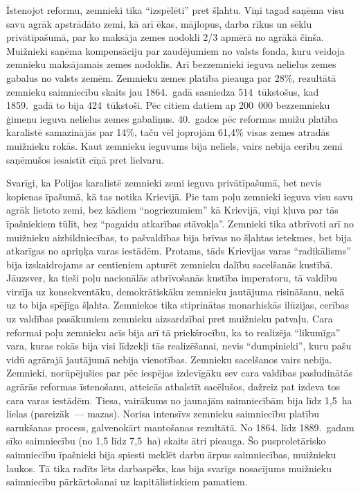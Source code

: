 \documentclass[twoside,a5paper,12pt,fleqn,openany]{extbook}
\begin{document}
Īstenojot reformu, zemnieki tika ``izspēlēti'' pret šļahtu. Viņi tagad saņēma visu savu agrāk apstrādāto zemi, kā arī ēkas, mājlopus, darba rīkus un sēklu privātīpašumā, par ko maksāja zemes nodokli 2/3 apmērā no agrākā činša. Muižnieki saņēma kompensāciju par zaudējumiem no valsts fonda, kuru veidoja zemnieku maksājamais zemes nodoklis. Arī bezzemnieki ieguva nelielus zemes gabalus no valsts zemēm. Zemnieku zemes platība pieauga par 28\%, rezultātā zemnieku saimniecību skaits jau 1864.~gadā sasniedza 514~tūkstošus, kad 1859.~gadā to bija 424~tūkstoši. Pēc citiem datiem ap 200~000 bezzemnieku ģimeņu ieguva nelielus zemes gabaliņus. 40.~gados pēc reformas muižu platība karalistē samazinājās par 14\%, taču vēl joprojām 61,4\% visas zemes atradās muižnieku rokās. Kaut zemnieku ieguvums bija neliels, vairs nebija cerību zemi saņēmušos iesaistīt cīņā pret lielvaru.

Svarīgi, ka Polijas karalistē zemnieki zemi ieguva privātīpašumā, bet nevis kopienas īpašumā, kā tas notika Krievijā. Pie tam poļu zemnieki ieguva visu savu agrāk lietoto zemi, bez kādiem ``nogriezumiem'' kā Krievijā, viņi kļuva par tās īpašniekiem tūlīt, bez ``pagaidu atkarības stāvokļa''. Zemnieki tika atbrīvoti arī no muižnieku aizbildniecības, to pašvaldības bija brīvas no šļahtas ietekmes, bet bija atkarīgas no apriņķa varas iestādēm. Protams, tāds Krievijas varas ``radikālisms'' bija izskaidrojams ar centieniem apturēt zemnieku dalību sacelšanās kustībā. Jāuzsver, ka tieši poļu nacionālās atbrīvošanās kustība imperatoru, tā valdību virzīja uz konsekventāku, demokrātiskāku zemnieku jautājuma risināšanu, nekā uz to bija spējīga šļahta. Zemniekos tika stiprinātas monarhiskās ilūzijas, cerības uz valdības pasākumiem zemnieku aizsardzībai pret muižnieku patvaļu. Cara reformai poļu zemnieku acīs bija arī tā priekšrocību, ka to realizēja ``likumīga'' vara, kuras rokās bija visi līdzekļi tās realizēšanai, nevis ``dumpinieki'', kuru pašu vidū agrārajā jautājumā nebija vienotības. Zemnieku sacelšanos vairs nebija. Zemnieki, norūpējušies par pēc iespējas izdevīgāku sev cara valdības pasludinātās agrārās reformas īstenošanu, atteicās atbalstīt sacēlušos, dažreiz pat izdeva tos cara varas iestādēm. Tiesa, vairākums no jaunajām saimniecībām bija līdz 1,5~ha lielas (pareizāk~--- mazas). Norisa intensīvs zemnieku saimniecību platību sarukšanas process, galvenokārt mantošanas rezultātā. No 1864. līdz 1889.~gadam sīko saimniecību (no 1,5 līdz 7,5~ha) skaits ātri pieauga. Šo pusproletārisko saimniecību īpašnieki bija spiesti meklēt darbu ārpus saimniecības, muižnieku laukos. Tā tika radīts lēts darbaspēks, kas bija svarīgs nosacījums muižnieku saimniecību pārkārtošanai uz kapitālistiskiem pamatiem.
\end{document}
